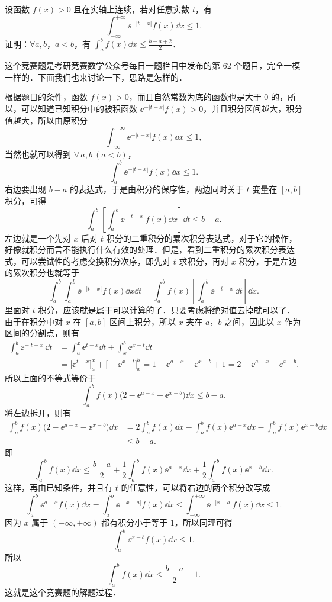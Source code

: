 设函数 $f(x)>0$ 且在实轴上连续，若对任意实数 $t$，有
\[
  \int_{-\infty}^{+\infty}\ee^{-|t-x|}f(x)\dd x\le 1.
\]
证明：$\forall a,b$，$a<b$，有 $\displaystyle \int_a^b f(x)\dd x\le\frac{b-a+2}{2}$．
\begin{solution}
  这个竞赛题是考研竞赛数学公众号每日一题栏目中发布的第 62 个题目，完全一模一样的．下面我们也来讨论一下，思路是怎样的．

  根据题目的条件，函数 $f(x)>0$，而且自然常数为底的函数也是大于 $0$ 的，所以，可以知道已知积分中的被积函数 $\ee^{-|t-x|}f(x)>0$，并且积分区间越大，积分值越大，所以由原积分
  \[
    \int_{-\infty}^{+\infty}\ee^{-|t-x|}f(x)\dd x\le 1,
  \]
  当然也就可以得到 $\forall\,a,b\ (a<b)$，
  \[
    \int_a^b\ee^{-|t-x|}f(x)\dd x\le 1.
  \]
  右边要出现 $b-a$ 的表达式，于是由积分的保序性，两边同时关于 $t$ 变量在 $[a,b]$ 积分，可得
  \[
    \int_a^b\left[\int_a^b\ee^{-|t-x|}f(x)\dd x\right]\dd t\le b-a.
  \]
  左边就是一个先对 $x$ 后对 $t$ 积分的二重积分的累次积分表达式，对于它的操作，好像就积分而言不能执行什么有效的处理．但是，看到二重积分的累次积分表达式，可以尝试性的考虑交换积分次序，即先对 $t$ 求积分，再对 $x$ 积分，于是左边的累次积分也就等于
  \[
    \int_a^b\int_a^b\ee^{-|t-x|}f(x)\dd x\dd t
    =\int_a^b f(x)\left[\int_a^b\ee^{-|t-x|}\dd t\right]\dd x.
  \]
  里面对 $t$ 积分，应该就是属于可以计算的了．只要考虑将绝对值去掉就可以了．由于在积分中对 $x$ 在 $[a,b]$ 区间上积分，所以 $x$ 夹在 $a$，$b$ 之间，因此以 $x$ 作为区间的分割点，则有
  \begin{align*}
    \int_a^b\ee^{-|t-x|}\dd t
    &=\int_a^x\ee^{t-x}\dd t+\int_x^b\ee^{x-t}\dd t\\
    &=\bigl[\ee^{t-x}\bigr]_a^x+\bigl[-\ee^{x-t}\bigr]_x^b
     =1-\ee^{a-x}-\ee^{x-b}+1=2-\ee^{a-x}-\ee^{x-b}.
  \end{align*}
  所以上面的不等式等价于
  \[
    \int_a^b f(x)\bigl(2-\ee^{a-x}-\ee^{x-b}\bigr)\dd x\le b-a.
  \]
  将左边拆开，则有
  \begin{align*}
    \int_a^b f(x)\bigl(2-\ee^{a-x}-\ee^{x-b}\bigr)\dd x
    &=2\int_a^b f(x)\dd x-\int_a^b f(x)\ee^{a-x}\dd x
      -\int_a^b f(x)\ee^{x-b}\dd x\\
    &\le b-a.
  \end{align*}
  即
  \[
    \int_a^b f(x)\dd x\le\frac{b-a}{2}
    +\frac{1}{2}\int_a^b f(x)\ee^{a-x}\dd x
    +\frac{1}{2}\int_a^b f(x)\ee^{x-b}\dd x.
  \]
  这样，再由已知条件，并且有 $t$ 的任意性，可以将右边的两个积分改写成
  \[
    \int_a^b\ee^{a-x}f(x)\dd x=\int_a^b\ee^{-|x-a|}f(x)\dd x
    \le\int_{-\infty}^{+\infty}\ee^{-|x-a|}f(x)\dd x\le 1.
  \]
  因为 $x$ 属于 $(-\infty,+\infty)$ 都有积分小于等于 $1$，所以同理可得
  \[
    \int_a^b\ee^{x-b}f(x)\dd x\le 1.
  \]
  所以
  \[
    \int_a^b f(x)\dd x\le\frac{b-a}{2}+1.
  \]
  这就是这个竞赛题的解题过程．
\end{solution}


